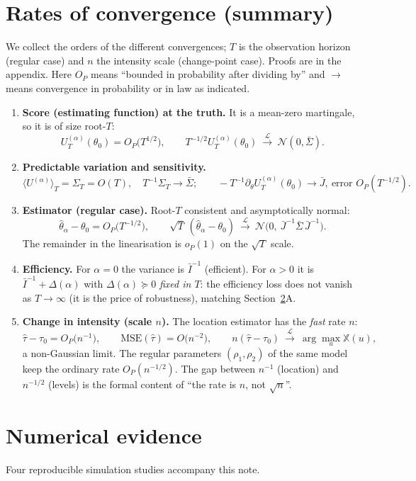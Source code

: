\documentclass[11pt]{article}
\newcommand{\toL}{\xrightarrow{\mathcal{L}}}
\begin{document}
\section{Rates of convergence (summary)}
\label{sec:rates}
We collect the orders of the different convergences; $T$ is the observation
horizon (regular case) and $n$ the intensity scale (change-point case). Proofs are
in the appendix. Here $O_P$ means ``bounded in probability after dividing by'' and
$\to$ means convergence in probability or in law as indicated.

\begin{enumerate}
\item \textbf{Score (estimating function) at the truth.} It is a mean-zero
martingale, so it is of size root-$T$:
\[
U_T^{(\alpha)}(\theta_0)=O_P\!\big(T^{1/2}\big),\qquad
T^{-1/2}U_T^{(\alpha)}(\theta_0)\ \toL\ \mathcal N(0,\bar\Sigma).
\]
\item \textbf{Predictable variation and sensitivity.}
\[
\langle U^{(\alpha)}\rangle_T=\Sigma_T=O(T),\quad T^{-1}\Sigma_T\to\bar\Sigma;
\qquad -T^{-1}\partial_\theta U_T^{(\alpha)}(\theta_0)\to\bar J,\ \text{error }O_P(T^{-1/2}).
\]
\item \textbf{Estimator (regular case).} Root-$T$ consistent and asymptotically
normal:
\[
\hat\theta_\alpha-\theta_0=O_P\!\big(T^{-1/2}\big),\qquad
\sqrt T\,(\hat\theta_\alpha-\theta_0)\ \toL\ \mathcal N\!\big(0,\ \bar J^{-1}\bar\Sigma\,\bar J^{-1}\big).
\]
The remainder in the linearisation is $o_P(1)$ on the $\sqrt T$ scale.
\item \textbf{Efficiency.} For $\alpha=0$ the variance is $\bar I^{-1}$ (efficient).
For $\alpha>0$ it is $\bar I^{-1}+\Delta(\alpha)$ with $\Delta(\alpha)\succeq0$
\emph{fixed in $T$}: the efficiency loss does not vanish as $T\to\infty$ (it is the
price of robustness), matching Section~\ref{sec:num}A.
\item \textbf{Change in intensity (scale $n$).} The location estimator has the
\emph{fast} rate $n$:
\[
\hat\tau-\tau_0=O_P\!\big(n^{-1}\big),\qquad \mathrm{MSE}(\hat\tau)=O\!\big(n^{-2}\big),
\qquad n(\hat\tau-\tau_0)\ \toL\ \arg\max_u \mathbb X(u),
\]
a non-Gaussian limit. The regular parameters $(\rho_1,\rho_2)$ of the same model
keep the ordinary rate $O_P(n^{-1/2})$. The gap between $n^{-1}$ (location) and
$n^{-1/2}$ (levels) is the formal content of ``the rate is $n$, not $\sqrt n$''.
\end{enumerate}

\section{Numerical evidence}
\label{sec:num}
Four reproducible simulation studies accompany this note.
\end{document}
